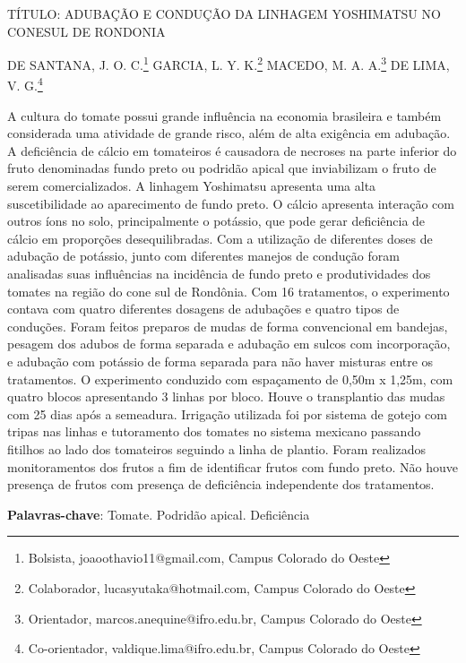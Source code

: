 \documentclass[article,12pt,onesidea,4paper,english,brazil]{abntex2}
\begin{document}
	
	
	\frenchspacing 
	
	\begin{center}
		\LARGE TÍTULO: ADUBAÇÃO E CONDUÇÃO DA LINHAGEM YOSHIMATSU NO CONESUL DE RONDONIA
		
		\normalsize
		DE SANTANA, J. O. C.\footnote{Bolsista, joaoothavio11@gmail.com, Campus Colorado do Oeste} 
		GARCIA, L. Y. K.\footnote{Colaborador, lucasyutaka@hotmail.com, Campus Colorado do Oeste} 
		MACEDO, M. A. A.\footnote{Orientador, marcos.anequine@ifro.edu.br, Campus Colorado do Oeste} 
	DE LIMA, V. G.\footnote{Co-orientador, valdique.lima@ifro.edu.br, Campus Colorado do Oeste} 
	\end{center}
	
	\noindent A cultura do tomate possui grande influência na economia brasileira e também considerada uma atividade de grande risco, além de alta exigência em adubação. A deficiência de cálcio em tomateiros é causadora de necroses na parte inferior do fruto denominadas fundo preto ou podridão apical que inviabilizam o fruto de serem comercializados. A linhagem Yoshimatsu apresenta uma alta suscetibilidade ao aparecimento de fundo preto. O cálcio apresenta interação com outros íons no solo, principalmente o potássio, que pode gerar deficiência de cálcio em proporções desequilibradas. Com a utilização de diferentes doses de adubação de potássio, junto com diferentes manejos de condução foram analisadas suas influências na incidência de fundo preto e produtividades dos tomates na região do cone sul de Rondônia. Com 16 tratamentos, o experimento contava com quatro diferentes dosagens de adubações e quatro tipos de conduções. Foram feitos preparos de mudas de forma convencional em bandejas, pesagem dos adubos de forma separada e adubação em sulcos com incorporação, e adubação com potássio de forma separada para não haver misturas entre os tratamentos. O experimento conduzido com espaçamento de 0,50m x 1,25m, com quatro blocos apresentando 3 linhas por bloco. Houve o transplantio das mudas com 25 dias após a semeadura. Irrigação utilizada foi por sistema de gotejo com tripas nas linhas e tutoramento dos tomates no sistema mexicano passando fitilhos ao lado dos tomateiros seguindo a linha de plantio. Foram realizados monitoramentos dos frutos a fim de identificar frutos com fundo preto. Não houve presença de frutos com presença de deficiência independente dos tratamentos.
	
	\vspace{\onelineskip}
	
	\noindent
	\textbf{Palavras-chave}: Tomate. Podridão apical. Deficiência
	
\end{document}
